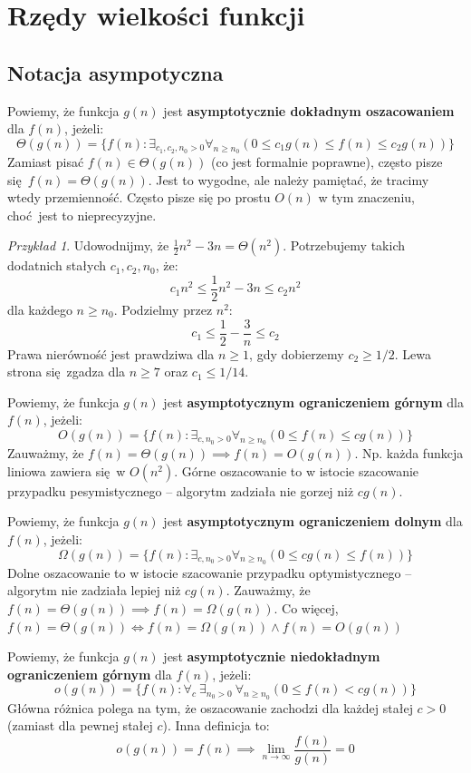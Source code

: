 \documentclass[10pt, oneside]{article}
\theoremstyle{remark}
\newtheorem*{example}{Przykład}
\begin{document}
\section{Rzędy wielkości funkcji}

\subsection{Notacja asympotyczna}

Powiemy, że funkcja $g(n)$ jest \textbf{asymptotycznie dokładnym oszacowaniem} dla $f(n)$, jeżeli:
$$
\Theta(g(n)) = \{ f(n): \exists_{c_1, c_2, n_0>0} \forall_{n \geq n_0} \left( 0 \leq c_1 g(n) \leq f(n) \leq c_2 g(n) \right) \}
$$
Zamiast pisać $f(n) \in \Theta(g(n))$ (co jest formalnie poprawne), często pisze się $f(n) = \Theta(g(n))$.
Jest to wygodne, ale należy pamiętać, że tracimy wtedy przemienność.
Często pisze się po prostu $O(n)$ w tym znaczeniu, choć jest to nieprecyzyjne.
\begin{example}
	Udowodnijmy, że $\frac{1}{2}n^2 - 3n = \Theta(n^2)$.
	Potrzebujemy takich dodatnich stałych $c_1, c_2, n_0$, że:
	$$
	c_1 n^2 \leq \frac{1}{2}n^2 - 3n \leq c_2 n^2
	$$
	dla każdego $n \geq n_0$.
	Podzielmy przez $n^2$:
	$$
	c_1 \leq \frac{1}{2} - \frac{3}{n} \leq c_2
	$$
	Prawa nierówność jest prawdziwa dla $n \geq 1$, gdy dobierzemy $c_2 \geq 1/2$.
	Lewa strona się zgadza dla $n \geq 7$ oraz $c_1 \leq 1/14$.
\end{example}

Powiemy, że funkcja $g(n)$ jest \textbf{asymptotycznym ograniczeniem górnym} dla $f(n)$, jeżeli:
$$
O(g(n)) = \{ f(n): \exists_{c, n_0>0} \forall_{n \geq n_0} \left(0 \leq f(n) \leq c g(n) \right) \}
$$
Zauważmy, że $f(n)=\Theta (g(n)) \implies f(n)=O(g(n))$.
Np. każda funkcja liniowa zawiera się w $O(n^2)$.
Górne oszacowanie to w istocie szacowanie przypadku pesymistycznego -- algorytm zadziała nie gorzej niż $cg(n)$.

Powiemy, że funkcja $g(n)$ jest \textbf{asymptotycznym ograniczeniem dolnym} dla $f(n)$, jeżeli:
$$
\Omega(g(n)) = \{ f(n): \exists_{c, n_0>0} \forall_{n \geq n_0} \left(0 \leq c g(n) \leq f(n) \right) \}
$$
Dolne oszacowanie to w istocie szacowanie przypadku optymistycznego -- algorytm nie zadziała lepiej niż $cg(n)$.
Zauważmy, że $f(n)=\Theta (g(n)) \implies f(n)=\Omega(g(n))$.
Co więcej, $f(n)=\Theta (g(n)) \iff f(n)=\Omega(g(n)) \land f(n)=O(g(n))$

Powiemy, że funkcja $g(n)$ jest \textbf{asymptotycznie niedokładnym ograniczeniem górnym} dla $f(n)$, jeżeli:
$$
o(g(n)) = \{ f(n): \forall_{c}\ \exists_{n_0>0}\ \forall_{n \geq n_0} \left(0 \leq f(n) < c g(n) \right) \}
$$
Główna różnica polega na tym, że oszacowanie zachodzi dla każdej stałej $c>0$ (zamiast dla pewnej stałej $c$).
Inna definicja to:
$$
o(g(n)) = f(n) \implies \lim_{n \to \infty} \frac{f(n)}{g(n)} = 0
$$
\end{document}
